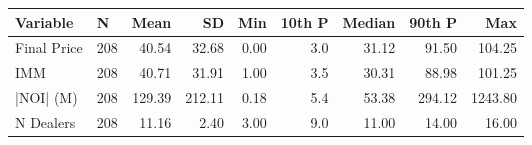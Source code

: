 \begin{tabular}{llrrrrrrr}
\toprule
   Variable &   N &   Mean &     SD &  Min &  10th P &  Median &  90th P &     Max \\
\midrule
Final Price & 208 &  40.54 &  32.68 & 0.00 &     3.0 &   31.12 &   91.50 &  104.25 \\
        IMM & 208 &  40.71 &  31.91 & 1.00 &     3.5 &   30.31 &   88.98 &  101.25 \\
  |NOI| (M) & 208 & 129.39 & 212.11 & 0.18 &     5.4 &   53.38 &  294.12 & 1243.80 \\
  N Dealers & 208 &  11.16 &   2.40 & 3.00 &     9.0 &   11.00 &   14.00 &   16.00 \\
\bottomrule
\end{tabular}
